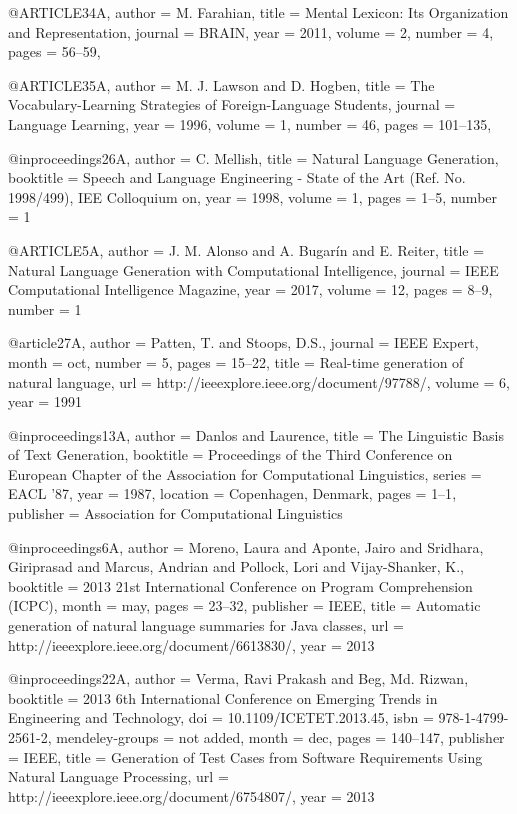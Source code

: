 @ARTICLE{34A,
  author = {M. Farahian},
  title = {Mental Lexicon: Its Organization and Representation},
  journal = {BRAIN},
  year = {2011},
  volume = {2},
  number = {4},
  pages = {56--59},
}

@ARTICLE{35A,
  author = {M. J. Lawson and D. Hogben},
  title = {The Vocabulary-Learning Strategies of Foreign-Language Students},
  journal = {Language Learning},
  year = {1996},
  volume = {1},
  number = {46},
  pages = {101--135},
}

@inproceedings{26A,
  author = {C. Mellish},
  title = {Natural Language Generation},
  booktitle = {Speech and Language Engineering - State of the Art (Ref. No. 1998/499), IEE Colloquium on},
  year = {1998},
  volume = {1},
  pages = {1--5},
  number = {1}
}

@ARTICLE{5A,
  author = {J. M. Alonso and A. Bugarín and E. Reiter},
  title = {Natural Language Generation with Computational Intelligence},
  journal = {IEEE Computational Intelligence Magazine},
  year = {2017},
  volume = {12},
  pages = {8--9},
  number = {1}
}

@article{27A,
author = {Patten, T. and Stoops, D.S.},
journal = {IEEE Expert},
month = {oct},
number = {5},
pages = {15--22},
title = {Real-time generation of natural language},
url = {http://ieeexplore.ieee.org/document/97788/},
volume = {6},
year = {1991}
}

@inproceedings{13A,
  author = {Danlos and Laurence},
  title = {The Linguistic Basis of Text Generation},
  booktitle = {Proceedings of the Third Conference on European Chapter of the Association for Computational Linguistics},
  series = {EACL '87},
  year = {1987},
  location = {Copenhagen, Denmark},
  pages = {1--1},
  publisher = {Association for Computational Linguistics}
}

@inproceedings{6A,
author = {Moreno, Laura and Aponte, Jairo and Sridhara, Giriprasad and Marcus, Andrian and Pollock, Lori and Vijay-Shanker, K.},
booktitle = {2013 21st International Conference on Program Comprehension (ICPC)},
month = {may},
pages = {23--32},
publisher = {IEEE},
title = {{Automatic generation of natural language summaries for Java classes}},
url = {http://ieeexplore.ieee.org/document/6613830/},
year = {2013}
}

@inproceedings{22A,
author = {Verma, Ravi Prakash and Beg, Md. Rizwan},
booktitle = {2013 6th International Conference on Emerging Trends in Engineering and Technology},
doi = {10.1109/ICETET.2013.45},
isbn = {978-1-4799-2561-2},
mendeley-groups = {not added},
month = {dec},
pages = {140--147},
publisher = {IEEE},
title = {{Generation of Test Cases from Software Requirements Using Natural Language Processing}},
url = {http://ieeexplore.ieee.org/document/6754807/},
year = {2013}
}

